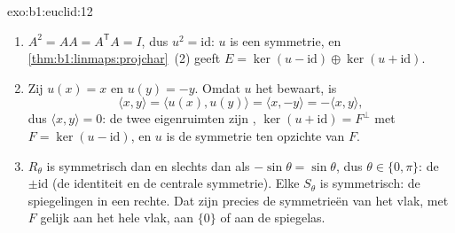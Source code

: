 \begin{solution}{exo:b1:euclid:12}
\begin{enumerate}
  \item $A^2 = A A = A^{\mathsf T} A = I$, dus $u^2 =
        \mathrm{id}$: $u$ is een symmetrie, en
        \cref{thm:b1:linmaps:projchar}~(2) geeft $E = \ker(u -
        \mathrm{id}) \oplus \ker(u + \mathrm{id})$.
  \item Zij $u(x) = x$ en $u(y) = -y$. Omdat $u$ het  bewaart, is
        \[
        \langle x, y\rangle = \langle u(x), u(y)\rangle
        = \langle x, -y\rangle = -\langle x, y\rangle ,
        \]
        dus $\langle x, y\rangle = 0$: de twee eigenruimten zijn
        , $\ker(u + \mathrm{id}) = F^\perp$ met $F =
        \ker(u - \mathrm{id})$, en $u$ is de  symmetrie
        ten opzichte van $F$.
  \item $R_\theta$ is symmetrisch dan en slechts dan als
        $-\sin\theta = \sin\theta$, dus $\theta \in \{0, \pi\}$: de
         $\pm\mathrm{id}$ (de identiteit en de centrale
        symmetrie). Elke $S_\theta$ is symmetrisch: de spiegelingen
        in een rechte. Dat zijn precies de  symmetrieën
        van het vlak, met $F$ gelijk aan het hele vlak, aan $\{0\}$
        of aan de spiegelas.
\end{enumerate}
\end{solution}

